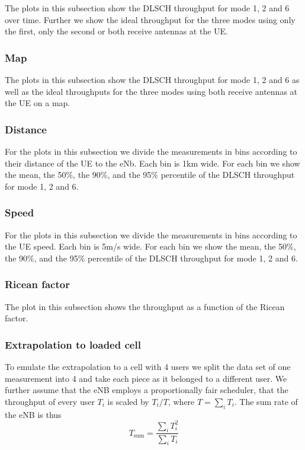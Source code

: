 \documentclass[a4paper,10pt]{article}
\begin{document}
The plots in this subsection show the DLSCH throughput for mode 1, 2 and 6 over time. Further we show the ideal throughput for the three modes using only the first, only the second or both receive antennas at the UE.


\subsubsection{Map}

The plots in this subsection show the DLSCH throughput for mode 1, 2 and 6 as well as the ideal throughputs for the three modes using  both receive antennas at the UE on a map.

\subsubsection{Distance}

For the plots in this subsection we divide the measurements in bins according to their distance of the UE to the eNb. Each bin is 1km wide. For each bin we show the mean, the 50\%, the 90\%, and the 95\% percentile of the DLSCH throughput for mode 1, 2 and 6. 

\subsubsection{Speed}

For the plots in this subsection we divide the measurements in bins according to the UE speed. Each bin is 5m/s wide. For each bin we show the mean, the 50\%, the 90\%, and the 95\% percentile of the DLSCH throughput for mode 1, 2 and 6. 

\subsubsection{Ricean factor}

The plot in this subsection shows the throughput as a function of the Ricean factor.

\subsubsection{Extrapolation to loaded cell}

To emulate the extrapolation to a cell with 4 users we split the data set of one measurement into 4 and take each piece as it belonged to a different user. We further assume that the eNB employs a proportionally fair scheduler, that the throughput of every user $T_i$ is scaled by $T_i/T$, where $T=\sum_i T_i$. The sum rate of the eNB is thus
\begin{equation}
 T_{\mathrm{sum}} = \frac{\sum_i T_i^2}{\sum_i T_i}
\end{equation}
\end{document}
